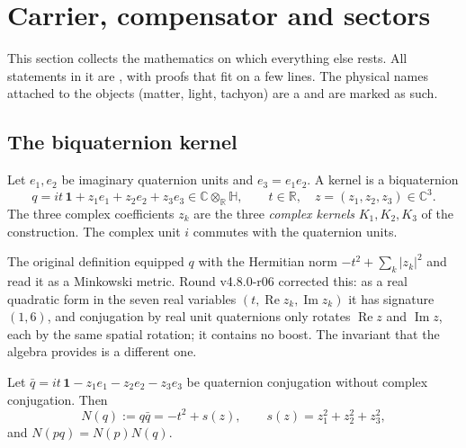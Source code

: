 \section{Carrier, compensator and sectors}
\label{sec:A-carrier}

This section collects the mathematics on which everything else rests. All statements in it are
\Established, with proofs that fit on a few lines. The physical names attached to the objects
(matter, light, tachyon) are a \Reading{} and are marked as such.

\subsection{The biquaternion kernel}
\label{sec:A-kernel}

\begin{definition}
\label{def:A-kernel}
Let $e_1,e_2$ be imaginary quaternion units and $e_3=e_1e_2$. A kernel is a biquaternion
\begin{equation}
q=it\,\mathbf 1+z_1e_1+z_2e_2+z_3e_3\in\mathbb C\otimes_{\mathbb R}\mathbb H,
\qquad t\in\mathbb R,\quad z=(z_1,z_2,z_3)\in\mathbb C^3 .
\label{eq:A-kernel}
\end{equation}
The three complex coefficients $z_k$ are the three \emph{complex kernels} $K_1,K_2,K_3$ of the
construction. The complex unit $i$ commutes with the quaternion units.
\end{definition}

The original definition equipped $q$ with the Hermitian norm $-t^2+\sum_k|z_k|^2$ and read it as a
Minkowski metric. Round v4.8.0-r06 corrected this: as a real quadratic form in the seven real
variables $(t,\operatorname{Re}z_k,\operatorname{Im}z_k)$ it has signature $(1,6)$, and conjugation by
real unit quaternions only rotates $\operatorname{Re}z$ and $\operatorname{Im}z$, each by the same spatial rotation; it
contains no boost. The invariant that the algebra provides is a different one.

\begin{proposition}
\label{prop:A-norm}
Let $\bar q=it\,\mathbf 1-z_1e_1-z_2e_2-z_3e_3$ be quaternion conjugation without complex
conjugation. Then
\begin{equation}
N(q):=q\bar q=-t^2+s(z),\qquad s(z)=z_1^2+z_2^2+z_3^2,
\label{eq:A-norm}
\end{equation}
and $N(pq)=N(p)N(q)$.
\end{proposition}

